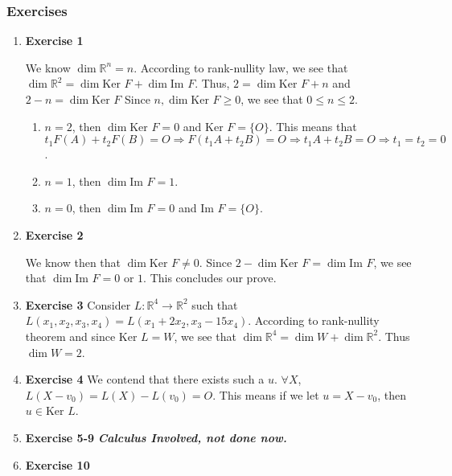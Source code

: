 \documentclass[11pt]{article}
\begin{document}
\subsubsection{Exercises}
\label{sec:org8df0fa6}
\begin{enumerate}
\item \textbf{Exercise 1}
\label{sec:org7efd120}

We know \(\dim \mathbb{R}^{n}=n\). According to rank-nullity law, we see that \(\dim \mathbb{R}^2=\dim \text{Ker }F+\dim \text{Im }F\). Thus, \(2=\dim \text{Ker }F+n\) and \(2-n=\dim \text{Ker }F\) Since \(n,\dim \text{Ker }F\geq 0\), we see that \(0\leq n\leq 2\).
\begin{enumerate}
\item \(n=2\), then \(\dim \text{Ker }F=0\) and \(\text{Ker }F=\{O\}\). This means that \(t_1F(A)+t_2F(B)=O \Rightarrow F(t_1A+t_2B)=O \Rightarrow t_1A+t_2B=O \Rightarrow t_1=t_2=0\).
\item \(n=1\), then \(\dim \text{Im }F=1\).
\item \(n=0\), then \(\dim \text{Im }F=0\) and \(\text{Im }F=\{O\}\).
\end{enumerate}
\item \textbf{Exercise 2}
\label{sec:org70de6a8}

We know then that \(\dim \text{Ker }F\not =0\). Since \(2-\dim \text{Ker } F=\dim \text{Im }F\), we see that \(\dim \text{Im }F=0\) or \(1\). This concludes our prove.
\item \textbf{Exercise 3}
\label{sec:orgcce967f}
Consider \(L:\mathbb{R}^4\rightarrow \mathbb{R}^2\) such that \(L(x_1,x_2,x_3,x_4)=L(x_1+2x_2,x_3-15x_4)\). According to rank-nullity theorem and since \(\text{Ker }L=W\), we see that \(\dim \mathbb{R}^4=\dim W+\dim \mathbb{R}^{2}\). Thus \(\dim W=2\).
\item \textbf{Exercise 4}
\label{sec:org83d1c23}
We contend that there exists such a \(u\). \(\forall X\), \(L(X-v_0)=L(X)-L(v_0)=O\). This means if we let \(u=X-v_0\), then \(u\in \text{Ker }L\).
\item \textbf{Exercise 5-9}
\label{sec:orgc09ce26}
\emph{\textbf{Calculus Involved, not done now.}}
\item \textbf{Exercise 10}
\label{sec:org74dad92}


\end{enumerate}
\end{document}
